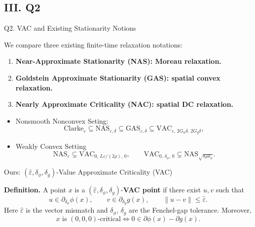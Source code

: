 \documentclass[10pt]{beamer}
\begin{document}
\subsection{III. Q2}
\begin{frame}{Q2. VAC and Existing Stationarity Notions}
\small
\vspace{0.5cm}

\medskip
We compare three existing finite-time relaxation notations:
\begin{enumerate}\setlength{\itemsep}{5pt}

    \item \textbf{Near-Approximate Stationarity (NAS): Moreau relaxation.}
    
    \item \textbf{Goldstein Approximate Stationarity (GAS): spatial convex relaxation.}

    \item \textbf{Nearly Approximate Criticality (NAC): spatial DC relaxation.}
\end{enumerate}

\medskip
{}
\begin{itemize}
    \item Nonsmooth Nonconvex Seting:
    \[
\mathrm{Clarke}_{\varepsilon} \subseteq
\mathrm{NAS}_{\varepsilon,\delta}  \subseteq
\mathrm{GAS}_{\varepsilon,\delta}  \subseteq 
\mathrm{VAC}_{\varepsilon,\,2G_\phi\delta,\,2G_g\delta},
\]

\item Weakly Convex Setting 
\[
     \mathrm{NAS}_{\varepsilon}
    \subsetneq
    \mathrm{VAC}_{0,\,L\varepsilon/(2\rho),\,0},
    \qquad
   \mathrm{VAC}_{0,\,\delta_\phi,\,0}
    \subsetneq
   \mathrm{NAS}_{\sqrt{8\rho\delta_\phi}}.
\]
\end{itemize}

\end{frame}

\begin{frame}{Ours: $(\widehat{\varepsilon},\delta_{\phi},\delta_g)$-Value Approximate Criticality (VAC)}
\small

\medskip
\textbf{Definition.}
A point $x$ is a
$(\widehat\varepsilon,\delta_{\phi}, \delta_g)$-\textbf{VAC point}
if there exist
$u,v$ such that
\[
    u\in\partial_{\delta_{\phi}}\phi(x),\qquad
    v\in\partial_{\delta_g}g(x),\qquad
    \|u-v\|\le\widehat\varepsilon.
\]
Here $\widehat\varepsilon$ is the vector mismatch and $\delta_\phi$, $\delta_g$ are the
Fenchel-gap tolerance. Moreover,
\[
    x\text{ is }(0, 0,0)\text{-critical}
    \iff 0\in\partial\phi(x)-\partial g(x).
\]

\end{frame}
\end{document}

